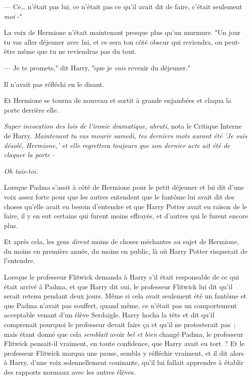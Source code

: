 --- Ce… n'était pas lui, ce n'était pas ce qu'il avait dit de faire, c'était seulement \emph{moi} -"

La voix de Hermione n'était maintenant presque plus qu'un murmure. "Un jour tu vas aller déjeuner avec lui, et ce sera ton côté obscur qui reviendra, ou peut-être même que tu ne reviendras pas du tout.

--- Je te promets," dit Harry, "que je \emph{vais} revenir du déjeuner."

Il n'avait pas réfléchi en le disant.

Et Hermione se tourna de nouveau et sortit à grande enjambées et claqua la porte derrière elle.

\emph{Super invocation des lois de l'ironie dramatique, abruti}, nota le Critique Interne de Harry. \emph{Maintenant tu vas mourir samedi, tes derniers mots auront été 'Je suis désolé, Hermione,' et elle regrettera toujours que son dernier acte ait été de claquer la porte -}

\emph{Oh tais-toi.}

\later

Lorsque Padma s'assit à côté de Hermione pour le petit déjeuner et lui dit d'une voix assez forte pour que les autres entendent que le fantôme lui avait dit des choses qu'elle avait eu besoin d'entendre et que Harry Potter avait eu raison de le faire, il y en eut certains qui furent moins effrayés, et d'autres qui le furent encore plus.

Et après cela, les gens \emph{dirent} moins de choses méchantes au sujet de Hermione, du moins en première année, du moins en public, là où Harry Potter risquerait de l'entendre.

Lorsque le professeur Flitwick demanda à Harry s'il était responsable de ce qui était arrivé à Padma, et que Harry dit oui, le professeur Flitwick lui dit qu'il serait retenu pendant deux jours. Même si cela avait seulement été un fantôme et que Padma n'avait pas souffert, quand même, ce n'était pas un comportement acceptable venant d'un élève Serdaigle. Harry hocha la tête et dit qu'il comprenait pourquoi le professeur devait faire ça et qu'il ne protesterait pas~; mais étant donné que cela \emph{semblait} avoir \emph{bel et bien} changé Padma, le professeur Flitwick pensait-il vraiment, en toute confidence, que Harry avait eu tort~? Et le professeur Flitwick marqua une pause, sembla y réfléchir vraiment, et il dit alors à Harry, d'une voix solennellement couinante, qu'il lui fallait apprendre à établir des rapports normaux avec les autres élèves.

